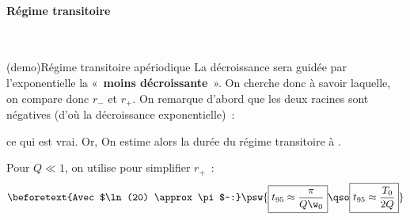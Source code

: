 \documentclass[../../main/main.tex]{subfiles}
\begin{document}
\paragraph{Régime transitoire}
~ \smallbreak

\begin{tcb*}[label=demo:transiaper, breakable](demo){Régime transitoire apériodique}
	La décroissance sera guidée par l'exponentielle la «~\textbf{moins
		décroissante}~». On cherche donc à savoir laquelle, on compare donc $r_-$ et
	$r_+$.
	\smallbreak
	On remarque d'abord que les deux racines sont négatives (d'où la décroissance
	exponentielle)~:
	\begin{isd}
		\vspace{-15pt}
		ce qui est vrai.
		\tcblower
		Or,
		\vspace{-25pt}
		On estime alors la durée du régime transitoire à .
	\end{isd}
	\bigbreak
	Pour $Q \ll 1$, on utilise  pour
	simplifier $r_+$~:
	\vspace{-15pt}
	\begin{gather*}
		\beforetext{Avec $\ln(20) \approx \pi$~:}
		\psw{%
			\boxed{t_{95} \approx \frac{\pi}{Q\w_0}}
			\qso
			\boxed{t_{95} \approx \frac{T_0}{2Q}}
		}%
	\end{gather*}
\end{tcb*}
\end{document}

